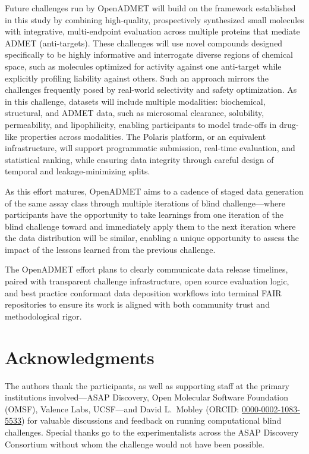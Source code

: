 \documentclass[journal=jcim,manuscript=article]{achemso}
\begin{document}
{Future challenges run by OpenADMET will build on the framework established in this study by combining high-quality, prospectively synthesized small molecules with integrative, multi-endpoint evaluation across multiple proteins that mediate ADMET (anti-targets). 
These challenges will use novel compounds designed specifically to be highly informative and interrogate diverse regions of chemical space, such as molecules optimized for activity against one anti-target while explicitly profiling liability against others. 
Such an approach mirrors the challenges frequently posed by real-world selectivity and safety optimization. 
As in this challenge, datasets will include multiple modalities: biochemical, structural, and ADMET data, such as microsomal clearance, solubility, permeability, and lipophilicity, enabling participants to model trade-offs in drug-like properties across modalities. 
The Polaris platform, or an equivalent infrastructure, will support programmatic submission, real-time evaluation, and statistical ranking, while ensuring data integrity through careful design of temporal and leakage-minimizing splits.

As this effort matures, OpenADMET aims to a cadence of staged data generation of the same assay class through multiple iterations of blind challenge---where participants have the opportunity to take learnings from one iteration of the blind challenge toward and immediately apply them to the next iteration where the data distribution will be similar, enabling a unique opportunity to assess the impact of the lessons learned from the previous challenge. 

The OpenADMET effort plans to clearly communicate data release timelines, paired with transparent challenge infrastructure, open source evaluation logic, and best practice conformant data deposition workflows into terminal FAIR repositories to ensure its work is aligned with both community trust and methodological rigor.

\section{Acknowledgments}

The authors thank the participants, as well as supporting staff at the primary institutions involved---ASAP Discovery, Open Molecular Software Foundation (OMSF), Valence Labs, UCSF---and David L.\ Mobley (ORCID: \href{https://orcid.org/0000-0002-1083-5533}{0000-0002-1083-5533}) for valuable discussions and feedback on running computational blind challenges. Special thanks go to the experimentalists across the ASAP Discovery Consortium without whom the challenge would not have been possible. 

}
\end{document}
